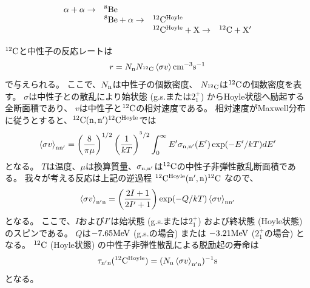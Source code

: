 \begin{equation}
  \begin{array}{llll}
    \alpha + \alpha \rightarrow & {}^{8}{\rm Be} & &\\
    & {}^{8}{\rm Be} + \alpha \rightarrow & {}^{12}{\rm C}^{{\rm Hoyle}} &\\
    & & {}^{12}{\rm C}^{{\rm Hoyle}} + {\rm X} \rightarrow & {}^{12}{\rm C} + {\rm X'}
  \end{array}\label{eq::triplealpha_particle}
\end{equation}

${}^{12}{\rm C}$と中性子の反応レートは
\begin{equation}
  r = N_{\rm n}N_{{}^{12}{\rm C}}\braket{\sigma v} {\rm cm}^{-3}{\rm s}^{-1}
  \label{eq::r}
\end{equation}
で与えられる。
ここで、$N_{{\rm n}}$は中性子の個数密度、
$N_{{}^{12}{\rm C}}$は${}^{12}{\rm C}$の個数密度を表す。
$\sigma$は中性子との散乱により始状態 (g.s.または$2_{1}^{+}$) からHoyle状態へ励起する全断面積であり、
$v$は中性子と${}^{12}{\rm C}$の相対速度である。
相対速度がMaxwell分布に従うとすると、${}^{12}{\rm C}({\rm n},{\rm n'}){}^{12}{\rm C}^{{\rm Hoyle}}$では
\begin{equation}
  \braket{\sigma v}_{\rm nn'} =
  \left(\frac{8}{\pi\mu}\right)^{1/2}\left(\frac{1}{kT}\right)^{^3/2}
  \int^{\infty}_{0}E'\sigma_{\rm n,n'}(E')\exp(-E'/kT)dE'
  \label{eq::sigmann'}
\end{equation}
となる。
$T$は温度、$\mu$は換算質量、$\sigma_{\rm n,n'}$は${}^{12}{\rm C}$の中性子非弾性散乱断面積である。
我々が考える反応は上記の逆過程 ${}^{12}{\rm C}^{{\rm Hoyle}}({\rm n',n}){}^{12}{\rm C}$ なので、
\begin{equation}
  \braket{\sigma v}_{\rm n'n} = \left(\frac{2I+1}{2I'+1}\right)
  \exp(-Q/kT)\braket{\sigma v}_{\rm nn'}
  \label{eq::sigman'n}
\end{equation}
となる。
ここで、$I$および$I'$は始状態 (g.s.または$2_{1}^{+}$)
および終状態 (Hoyle状態) のスピンである。
$Q$は$-7.65{\rm MeV}$ (g.s.の場合) または
$-3.21{\rm MeV}$ ($2_{1}^{+}$の場合) となる。
${}^{12}{\rm C}$ (Hoyle状態) の中性子非弾性散乱による脱励起の寿命は
\begin{equation}
  \tau_{\rm n'n}({}^{12}{\rm C}^{{\rm Hoyle}}) =
  (N_{\rm n}\braket{\sigma v}_{\rm n'n})^{-1} {\rm s}
  \label{eq::tau}
\end{equation}
となる。

